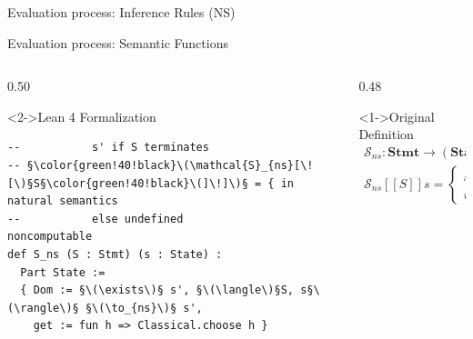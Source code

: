 \documentclass[xcolor={dvipsnames,table}]{beamer}
\begin{document}
\begin{frame}[fragile]{Evaluation process: \alert{Inference Rules} (NS)}
\end{frame}

\begin{frame}[fragile]{Evaluation process: \alert{Semantic Functions}}

    \begin{columns}[T]
        
        \begin{column}{0.50\textwidth}
            \begin{block}<2->{Lean 4 Formalization}
                \begin{lstlisting}[style=lean4, basicstyle=\scriptsize\ttfamily]
--           s' if S terminates
-- §\color{green!40!black}\(\mathcal{S}_{ns}[\![\)§S§\color{green!40!black}\(]\!]\)§ = { in natural semantics
--           else undefined
noncomputable
def S_ns (S : Stmt) (s : State) :
  Part State :=
  { Dom := §\(\exists\)§ s', §\(\langle\)§S, s§\(\rangle\)§ §\(\to_{ns}\)§ s',
    get := fun h => Classical.choose h }
                \end{lstlisting}
            \end{block}
        \end{column}

        \begin{column}{0.48\textwidth}
            \begin{block}<1->{Original Definition}
\scriptsize
\[
\begin{array}{lcl}
        \mathcal{S}_{ns}: \mathbf{Stmt} \to (\mathbf{State} \hookrightarrow \mathbf{State})
        \\[0.8em]
        \mathcal{S}_{ns}[\![S]\!]s = \begin{cases}
            s' & if \langle S, s \rangle \to s'\\
            undef & otherwise
        \end{cases}
\end{array}
\]
            \end{block}
        \end{column}
        
    \end{columns}
\end{frame}
\end{document}
